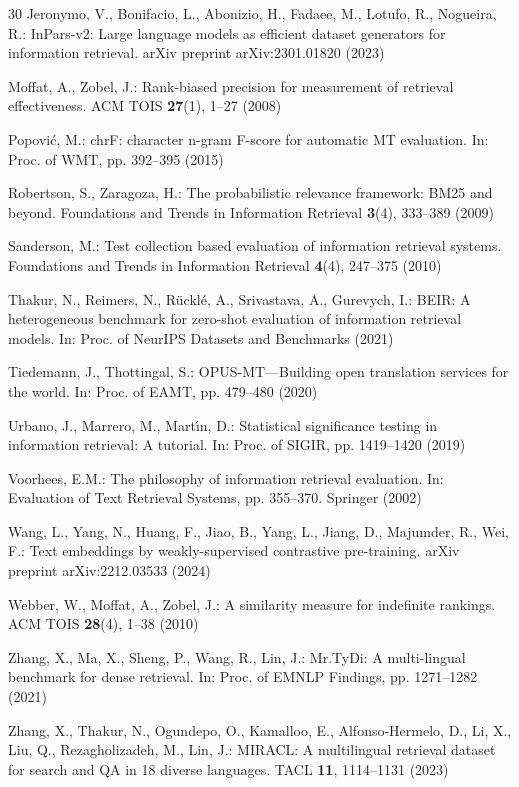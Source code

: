 \documentclass[runningheads]{llncs}
\begin{document}
\begin{thebibliography}{30}
Jeronymo, V., Bonifacio, L., Abonizio, H., Fadaee, M., Lotufo, R., Nogueira, R.: InPars-v2: Large language models as efficient dataset generators for information retrieval. arXiv preprint arXiv:2301.01820 (2023)

Moffat, A., Zobel, J.: Rank-biased precision for measurement of retrieval effectiveness. ACM TOIS \textbf{27}(1), 1--27 (2008)

Popovi{\'c}, M.: chrF: character n-gram F-score for automatic MT evaluation. In: Proc. of WMT, pp. 392--395 (2015)

Robertson, S., Zaragoza, H.: The probabilistic relevance framework: BM25 and beyond. Foundations and Trends in Information Retrieval \textbf{3}(4), 333--389 (2009)

Sanderson, M.: Test collection based evaluation of information retrieval systems. Foundations and Trends in Information Retrieval \textbf{4}(4), 247--375 (2010)

Thakur, N., Reimers, N., R{\"u}ckl{\'e}, A., Srivastava, A., Gurevych, I.: BEIR: A heterogeneous benchmark for zero-shot evaluation of information retrieval models. In: Proc. of NeurIPS Datasets and Benchmarks (2021)

Tiedemann, J., Thottingal, S.: OPUS-MT---Building open translation services for the world. In: Proc. of EAMT, pp. 479--480 (2020)

Urbano, J., Marrero, M., Mart{\'\i}n, D.: Statistical significance testing in information retrieval: A tutorial. In: Proc. of SIGIR, pp. 1419--1420 (2019)

Voorhees, E.M.: The philosophy of information retrieval evaluation. In: Evaluation of Text Retrieval Systems, pp. 355--370. Springer (2002)

Wang, L., Yang, N., Huang, F., Jiao, B., Yang, L., Jiang, D., Majumder, R., Wei, F.: Text embeddings by weakly-supervised contrastive pre-training. arXiv preprint arXiv:2212.03533 (2024)

Webber, W., Moffat, A., Zobel, J.: A similarity measure for indefinite rankings. ACM TOIS \textbf{28}(4), 1--38 (2010)

Zhang, X., Ma, X., Sheng, P., Wang, R., Lin, J.: Mr.TyDi: A multi-lingual benchmark for dense retrieval. In: Proc. of EMNLP Findings, pp. 1271--1282 (2021)

Zhang, X., Thakur, N., Ogundepo, O., Kamalloo, E., Alfonso-Hermelo, D., Li, X., Liu, Q., Rezagholizadeh, M., Lin, J.: MIRACL: A multilingual retrieval dataset for search and QA in 18 diverse languages. TACL \textbf{11}, 1114--1131 (2023)

\end{thebibliography}
\end{document}
